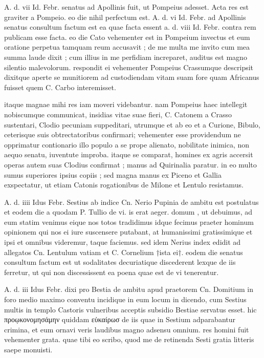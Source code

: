  A. d. vii Id. Febr. senatus ad Apollinis fuit, ut Pompeius adesset. Acta res est graviter a Pompeio. eo die nihil perfectum est. A. d. vi Id. Febr. ad Apollinis senatus consultum factum est ea quae facta essent a. d. viii Id. Febr. contra rem publicam esse facta. eo die Cato vehementer est in Pompeium invectus et eum oratione perpetua tamquam reum accusavit ; de me multa me invito cum mea summa laude dixit ; cum illius in me perfidiam increparet, auditus est magno silentio malevolorum. respondit ei vehementer Pompeius Crassumque descripsit dixitque aperte se munitiorem ad custodiendam vitam suam fore quam Africanus fuisset quem C. Carbo interemisset.

 itaque magnae mihi res iam moveri videbantur. nam Pompeius haec intellegit nobiscumque communicat, insidias vitae suae fieri, C. Catonem a Crasso sustentari, Clodio pecuniam suppeditari, utrumque et ab eo et a Curione, Bibulo, ceterisque suis obtrectatoribus confirmari; vehementer esse providendum ne opprimatur contionario illo populo a se prope alienato, nobilitate inimica, non aequo senatu, iuventute improba. itaque se comparat, homines ex agris accersit operas autem suas Clodius confirmat ; manus ad Quirinalia paratur. in eo multo sumus superiores ipsius copiis ; sed magna manus ex Piceno et Gallia exspectatur, ut etiam Catonis rogationibus de Milone et Lentulo resistamus.

 A. d. iiii Idus Febr. Sestius ab indice Cn. Nerio Pupinia de ambitu est postulatus et eodem die a quodam P. Tullio de vi. is erat aeger. domum , ut debuimus, ad eum statim venimus eique nos totos tradidimus idque fecimus praeter hominum opinionem qui nos ei iure suscensere putabant, at humanissimi gratissimique et ipsi et omnibus videremur, taque faciemus. sed idem Nerius index edidit ad allegatos Cn. Lentulum vatiam et C. Cornelium †ista ei†. eodem die senatus consultum factum est ut sodalitates decuriatique discederent lexque de iis ferretur, ut qui non discessissent ea poena quae est de vi tenerentur.

 A. d. iii Idus Febr. dixi pro Bestia de ambitu apud praetorem Cn. Domitium in foro medio maximo conventu incidique in eum locum in dicendo, cum Sestius multis in templo Castoris vulneribus acceptis subsidio Bestiae servatus esset. hic προῳκονομησάμην quiddam εὐκαίρωσ de iis quae in Sestium adparabantur crimina, et eum ornavi veris laudibus magno adsensu omnium. res homini fuit vehementer grata. quae tibi eo scribo, quod me de retinenda Sesti gratia litteris saepe monuisti.

